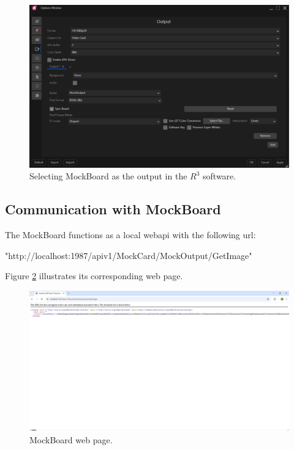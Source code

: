 \begin{figure}[h]
    \centering
    \includegraphics[width=\textwidth]{Images/05optimize/Mockboard.png}
    \caption{Selecting MockBoard as the output in the $R^3$ software.}
    \label{fig:MockBoard}
\end{figure}

\subsection{Communication with MockBoard} \label{subsec:MockBoardComm}

\noindent The MockBoard functions as a local webapi with the following url:

"http://localhost:1987/apiv1/MockCard/MockOutput/GetImage"

\noindent Figure \ref{fig:webapi} illustrates its corresponding web page. 

\begin{figure}[h]
    \centering
    \includegraphics[width=\textwidth]{Images/05optimize/webapi.png}
    \caption{MockBoard web page.}
    \label{fig:webapi}
\end{figure}

